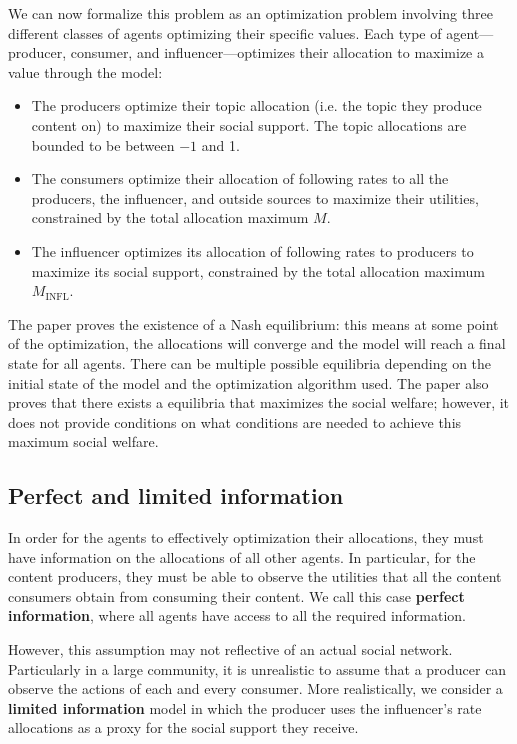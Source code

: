 \documentclass[11pt, letterpaper]{article}
\begin{document}
We can now formalize this problem as an optimization problem involving three different classes of agents optimizing their specific values. Each type of agent---producer, consumer, and influencer---optimizes their allocation to maximize a value through the model:
\begin{itemize}
    \item The producers optimize their topic allocation (i.e. the topic they produce content on) to maximize their social support. The topic allocations are bounded to be between \(-1\) and 1.
    \item The consumers optimize their allocation of following rates to all the producers, the influencer, and outside sources to maximize their utilities, constrained by the total allocation maximum \(M\).
    \item The influencer optimizes its allocation of following rates to producers to maximize its social support, constrained by the total allocation maximum \(M_\text{INFL}\).
\end{itemize}

The paper proves the existence of a Nash equilibrium: this means at some point of the optimization, the allocations will converge and the model will reach a final state for all agents. There can be multiple possible equilibria depending on the initial state of the model and the optimization algorithm used. The paper also proves that there exists a equilibria that maximizes the social welfare; however, it does not provide conditions on what conditions are needed to achieve this maximum social welfare.

\subsection{Perfect and limited information}

In order for the agents to effectively optimization their allocations, they must have information on the allocations of all other agents. In particular, for the content producers, they must be able to observe the utilities that all the content consumers obtain from consuming their content. We call this case \textbf{perfect information}, where all agents have access to all the required information.

However, this assumption may not reflective of an actual social network. Particularly in a large community, it is unrealistic to assume that a producer can observe the actions of each and every consumer. More realistically, we consider a \textbf{limited information} model in which the producer uses the influencer's rate allocations as a proxy for the social support they receive.
\end{document}
